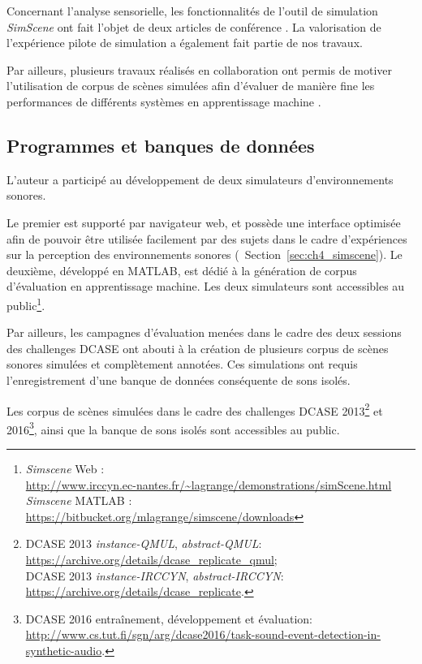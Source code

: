 Concernant l'analyse sensorielle, les fonctionnalités de l'outil de simulation \emph{SimScene} ont fait l'objet de deux articles de conférence  \citep{rossignol2015simscene,lafay2016JAES}. La valorisation de l'expérience pilote de simulation \citep{lafay2014new} a également fait partie de nos travaux.

Par ailleurs, plusieurs travaux réalisés en collaboration ont permis de motiver l'utilisation de corpus de scènes simulées afin d'évaluer de manière fine les performances de différents systèmes en apprentissage machine \citep{benetos2016detectionLDC,rossignol2015alternate,benetos2016detection}.

\subsection{Programmes et banques de données}

L'auteur a participé au développement de deux simulateurs d'environnements sonores.

Le premier est supporté par navigateur web, et possède une interface optimisée afin de pouvoir être utilisée facilement par des sujets dans le cadre d'expériences sur la perception des environnements sonores (\cf~Section~\ref{sec:ch4_simscene}). Le deuxième, développé en MATLAB, est dédié à la génération de corpus d'évaluation en apprentissage machine. Les deux simulateurs sont accessibles au public\footnote{\emph{Simscene} Web : \\ \url{http://www.irccyn.ec-nantes.fr/~lagrange/demonstrations/simScene.html} \\ \emph{Simscene} MATLAB : \\ \url{https://bitbucket.org/mlagrange/simscene/downloads}}.

Par ailleurs, les campagnes d'évaluation menées dans le cadre des deux sessions des challenges DCASE ont abouti à la création de plusieurs corpus de scènes sonores simulées et complètement annotées. Ces simulations ont requis l'enregistrement d'une banque de données conséquente de sons isolés.

Les corpus de scènes simulées dans le cadre des challenges DCASE 2013\footnote{DCASE 2013 \emph{instance-QMUL}, \emph{abstract-QMUL}: \\ \url{https://archive.org/details/dcase_replicate_qmul}; \\ DCASE 2013 \emph{instance-IRCCYN}, \emph{abstract-IRCCYN}: \\ \url{https://archive.org/details/dcase_replicate}.} et 2016\footnote{DCASE 2016 entraînement, développement et évaluation: \\ \url{http://www.cs.tut.fi/sgn/arg/dcase2016/task-sound-event-detection-in-synthetic-audio}.}, ainsi que la banque de sons isolés sont accessibles au public.








